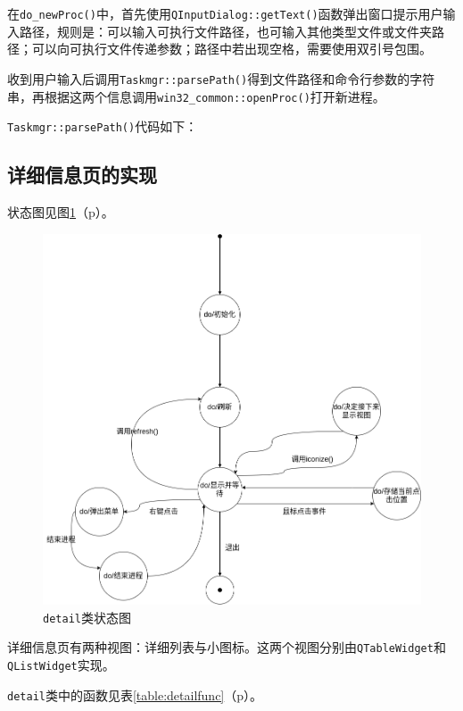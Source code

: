 \documentclass[UTF8,twoside,titlepage]{ctexart}
\newcommand\code[1]{\texttt{#1}}
\newcommand\myref[1]{\ref{#1}（p\pageref{#1}）}
\begin{document}
在\code{do\_newProc()}中，首先使用\code{QInputDialog::getText()}函数弹出窗口提示用户输入路径，规则是：可以输入可执行文件路径，也可输入其他类型文件或文件夹路径；可以向可执行文件传递参数；路径中若出现空格，需要使用双引号包围。

收到用户输入后调用\code{Taskmgr::parsePath()}得到文件路径和命令行参数的字符串，再根据这两个信息调用\code{win32\_common::openProc()}打开新进程。

\code{Taskmgr::parsePath()}代码如下：

{
    \ttfamily
    
}

\subsection{详细信息页的实现}
状态图见图\myref{fig:detailstat}。

\begin{figure}[htb]
    \centering
    \includegraphics[scale=0.42]{../dia/detail.png}
    \caption{\code{detail}类状态图}
    \label{fig:detailstat}
\end{figure}

详细信息页有两种视图：详细列表与小图标。这两个视图分别由\code{QTableWidget}和\code{QListWidget}实现。

\code{detail}类中的函数见表\myref{table:detailfunc}。
\end{document}

